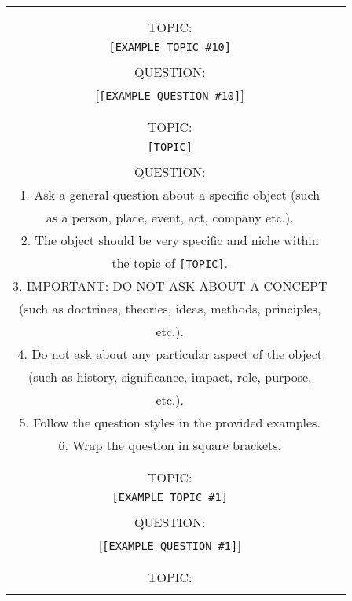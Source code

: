 \begin{table}[th]
\begin{tabular}{c|c}
{            ...
            \\
            \\
            TOPIC:\\
            \texttt{[EXAMPLE TOPIC \#10]}\\
            \\
            QUESTION:\\
            {[\texttt{[EXAMPLE QUESTION \#10]}]}\\
            \\
            \\
            TOPIC:\\
            \texttt{[TOPIC]}\\
            \\
            QUESTION:
        } & 
        \makecell[tl]{
            Instructions:\\
            1. Ask a general question about a specific object (such\\as a person, place, event, act, company etc.).\\
            2. The object should be very specific and niche within\\the topic of \texttt{[TOPIC]}.\\
            3. IMPORTANT: DO NOT ASK ABOUT A CONCEPT\\(such as doctrines, theories, ideas, methods, principles,\\etc.).\\
            4. Do not ask about any particular aspect of the object\\(such as history, significance, impact, role, purpose,\\etc.).\\
            5. Follow the question styles in the provided examples.\\
            6. Wrap the question in square brackets.\\
            \\
            \\
            TOPIC:\\
            \texttt{[EXAMPLE TOPIC \#1]}\\
            \\
            QUESTION:\\
            {[\texttt{[EXAMPLE QUESTION \#1]}]}\\
            \\
            \\
            TOPIC:\\
}
\end{tabular}
\end{table}
